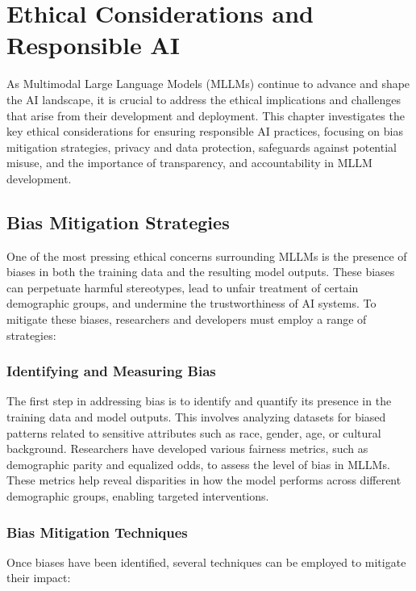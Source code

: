 \chapter{Ethical Considerations and Responsible AI}

As Multimodal Large Language Models (MLLMs) continue to advance and shape the AI landscape, it is crucial to address the ethical implications and challenges that arise from their development and deployment. This chapter investigates the key ethical considerations for ensuring responsible AI practices, focusing on bias mitigation strategies, privacy and data protection, safeguards against potential misuse, and the importance of transparency, and accountability in MLLM development.

\section{Bias Mitigation Strategies}

One of the most pressing ethical concerns surrounding MLLMs is the presence of biases in both the training data and the resulting model outputs. These biases can perpetuate harmful stereotypes, lead to unfair treatment of certain demographic groups, and undermine the trustworthiness of AI systems. To mitigate these biases, researchers and developers must employ a range of strategies:

\subsection{Identifying and Measuring Bias}

The first step in addressing bias is to identify and quantify its presence in the training data and model outputs. This involves analyzing datasets for biased patterns related to sensitive attributes such as race, gender, age, or cultural background. Researchers have developed various fairness metrics, such as demographic parity and equalized odds, to assess the level of bias in MLLMs. These metrics help reveal disparities in how the model performs across different demographic groups, enabling targeted interventions.

\subsection{Bias Mitigation Techniques}

Once biases have been identified, several techniques can be employed to mitigate their impact:

